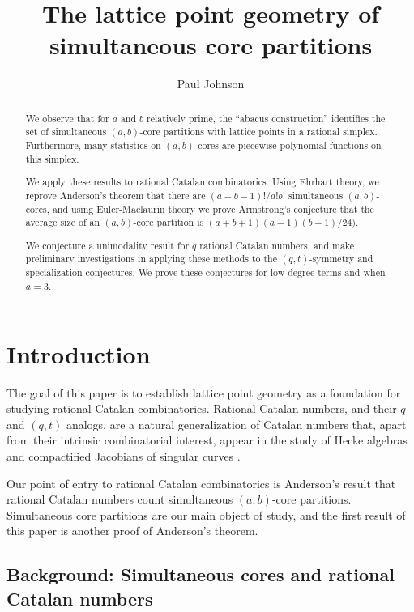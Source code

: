 \documentclass{amsart}[12pt]
\theoremstyle{definition}
\begin{document}
\title{The lattice point geometry of simultaneous core partitions}
\begin{abstract}
We observe that for $a$ and $b$ relatively prime, the ``abacus construction'' identifies the set of simultaneous $(a,b)$-core partitions with lattice points in a rational simplex. Furthermore, many statistics on $(a,b)$-cores are piecewise polynomial functions on this simplex.  

We apply these results to rational Catalan combinatorics.  Using Ehrhart theory, we reprove Anderson's theorem \cite{anderson} that there are $(a+b-1)!/a!b!$ simultaneous $(a,b)$-cores, and using Euler-Maclaurin theory we prove Armstrong's conjecture \cite{AHJ} that the average size of an $(a,b)$-core partition is $(a+b+1)(a-1)(b-1)/24)$.

We conjecture a unimodality result for $q$ rational Catalan numbers, and make preliminary investigations in applying these methods to the $(q,t)$-symmetry and specialization conjectures.  We prove these conjectures for low degree terms and when $a=3$.

\end{abstract}


\author{Paul Johnson}
\date{}
\maketitle
\section{Introduction}
The goal of this paper is to establish lattice point geometry as a foundation for studying rational Catalan combinatorics.  Rational Catalan numbers, and their $q$ and $(q,t)$ analogs, are a natural generalization of Catalan numbers that, apart from their intrinsic combinatorial interest, appear in the study of Hecke algebras \cite{GG} and compactified Jacobians of singular curves \cite{EM1, EM2} . 
 
Our point of entry to rational Catalan combinatorics is Anderson's \cite{anderson} result that rational Catalan numbers count simultaneous $(a,b)$-core partitions.  Simultaneous core partitions are our main object of study, and the first result of this paper is another proof of Anderson's theorem.




\subsection{Background: Simultaneous cores and rational Catalan numbers}
\end{document}
